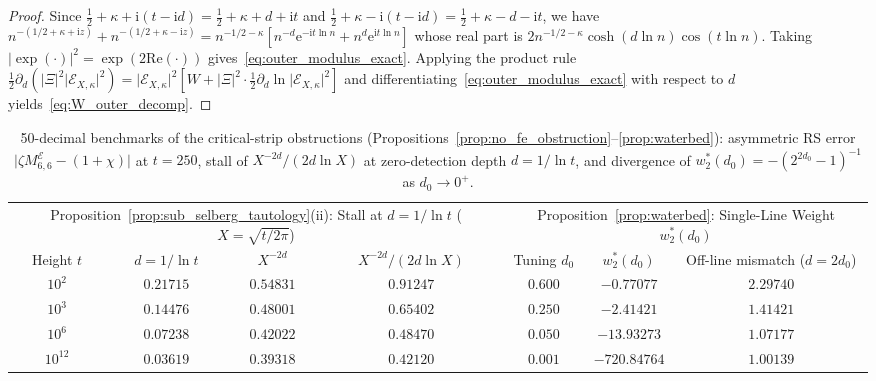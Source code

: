 \documentclass[11pt,reqno]{amsart}
\theoremstyle{definition}
\theoremstyle{remark}
\numberwithin{equation}{section}
\newcommand{\ii}{\mathrm{i}}
\newcommand{\ee}{\mathrm{e}}
\newcommand{\Rea}{\mathrm{Re}}
\begin{document}
\begin{proof}
Since $\frac{1}{2}+\kappa+\ii(t-\ii d) = \frac{1}{2}+\kappa+d+\ii t$ and $\frac{1}{2}+\kappa-\ii(t-\ii d) = \frac{1}{2}+\kappa-d-\ii t$, we have $n^{-(1/2+\kappa+\ii z)} + n^{-(1/2+\kappa-\ii z)} = n^{-1/2-\kappa}[n^{-d}\ee^{-\ii t\ln n} + n^d\ee^{\ii t\ln n}]$ whose real part is $2n^{-1/2-\kappa}\cosh(d\ln n)\cos(t\ln n)$. Taking $\lvert\exp(\cdot)\rvert^2 = \exp(2\Rea(\cdot))$ gives~\eqref{eq:outer_modulus_exact}. Applying the product rule $\frac{1}{2}\partial_d(\lvert\Xi\rvert^2\lvert\mathcal{E}_{X,\kappa}\rvert^2) = \lvert\mathcal{E}_{X,\kappa}\rvert^2[W + \lvert\Xi\rvert^2 \cdot \frac{1}{2}\partial_d\ln\lvert\mathcal{E}_{X,\kappa}\rvert^2]$ and differentiating~\eqref{eq:outer_modulus_exact} with respect to $d$ yields~\eqref{eq:W_outer_decomp}.
\end{proof}

\begin{table}[t]
\centering
\caption{50-decimal benchmarks of the critical-strip obstructions (Propositions~\ref{prop:no_fe_obstruction}--\ref{prop:waterbed}): asymmetric RS error $\lvert\zeta M_{6,6}^{\mathcal{E}} - (1+\chi)\rvert$ at $t = 250$, stall of $X^{-2d}/(2d\ln X)$ at zero-detection depth $d = 1/\ln t$, and divergence of $w_2^*(d_0) = -(2^{2d_0}-1)^{-1}$ as $d_0 \to 0^+$.}\label{tab:obstruction_benchmarks}
\scriptsize
\setlength{\tabcolsep}{4.2pt}
\begin{tabular}{@{}cccc|ccc@{}}
\toprule
\multicolumn{4}{c|}{Proposition~\ref{prop:sub_selberg_tautology}(ii): Stall at $d = 1/\ln t$ ($X = \sqrt{t/2\pi}$)} & \multicolumn{3}{c}{Proposition~\ref{prop:waterbed}: Single-Line Weight $w_2^*(d_0)$} \\
\cmidrule(r){1-4}\cmidrule(l){5-7}
Height $t$ & $d = 1/\ln t$ & $X^{-2d}$ & $X^{-2d}/(2d\ln X)$ & Tuning $d_0$ & $w_2^*(d_0)$ & Off-line mismatch ($d = 2d_0$) \\
\midrule
$10^{2}$  & $0.21715$ & $0.54831$ & $0.91247$ & $0.600$ & $-0.77077$   & $2.29740$ \\
$10^{3}$  & $0.14476$ & $0.48001$ & $0.65402$ & $0.250$ & $-2.41421$   & $1.41421$ \\
$10^{6}$  & $0.07238$ & $0.42022$ & $0.48470$ & $0.050$ & $-13.93273$  & $1.07177$ \\
$10^{12}$ & $0.03619$ & $0.39318$ & $0.42120$ & $0.001$ & $-720.84764$ & $1.00139$ \\
\bottomrule
\end{tabular}
\end{table}
\end{document}
